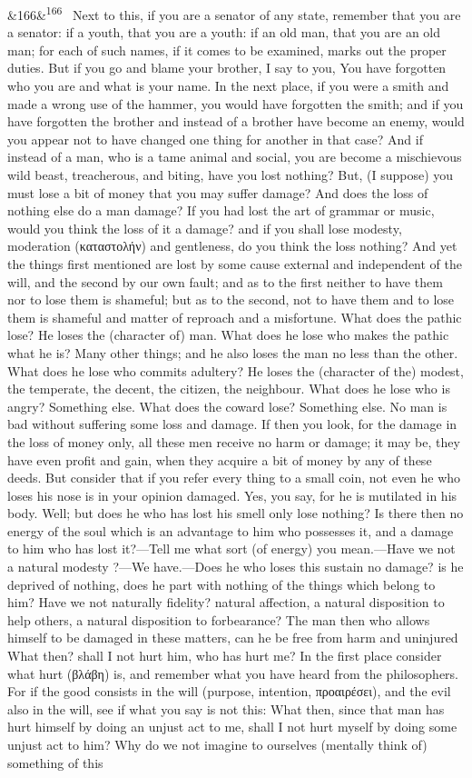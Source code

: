 \documentclass[12pt]{article}
\newcommand{\para}[1][]{\par\noindent\ifx&#1&\else\textsuperscript{\footnotesize #1}~\fi}
\begin{document}
\para[166] Next to this, if you are a senator of any state, remember that you are a senator: if a youth, that you are a youth: if an old man, that you are an old man; for each of such names, if it comes to be examined, marks out the proper duties. But if you go and blame your brother, I say to you, You have forgotten who you are and what is your name. In the next place, if you were a smith and made a wrong use of the hammer, you would have forgotten the smith; and if you have forgotten the brother and instead of a brother have become an enemy, would you appear not to have changed one thing for another in that case? And if instead of a man, who is a tame animal and social, you are become a mischievous wild beast, treacherous, and biting, have you lost nothing? But, (I suppose) you must lose a bit of money that you may suffer damage? And does the loss of nothing else do a man damage? If you had lost the art of grammar or music, would you think the loss of it a damage? and if you shall lose modesty, moderation (καταστολήν) and gentleness, do you think the loss nothing? And yet the things first mentioned are lost by some cause external and independent of the will, and the second by our own fault; and as to the first neither to have them nor to lose them is shameful; but as to the second, not to have them and to lose them is shameful and matter of reproach and a misfortune. What does the pathic lose? He loses the (character of) man. What does he lose who makes the pathic what he is? Many other things; and he also loses the man no less than the other. What does he lose who commits adultery? He loses the (character of the) modest, the temperate, the decent, the citizen, the neighbour. What does he lose who is angry? Something else. What does the coward lose? Something else. No man is bad without suffering some loss and damage. If then you look, for the damage in the loss of money only, all these men receive no harm or damage; it may be, they have even profit and gain, when they acquire a bit of money by any of these deeds. But consider that if you refer every thing to a small coin, not even he who loses his nose is in your opinion damaged. Yes, you say, for he is mutilated in his body. Well; but does he who has lost his smell only lose nothing? Is there then no energy of the soul which is an advantage to him who possesses it, and a damage to him who has lost it?—Tell me what sort (of energy) you mean.—Have we not a natural modesty ?—We have.—Does he who loses this sustain no damage? is he deprived of nothing, does he part with nothing of the things which belong to him? Have we not naturally fidelity? natural affection, a natural disposition to help others, a natural disposition to forbearance? The man then who allows himself to be damaged in these matters, can he be free from harm and uninjured What then? shall I not hurt him, who has hurt me? In the first place consider what hurt (βλάβη) is, and remember what you have heard from the philosophers. For if the good consists in the will (purpose, intention, προαιρέσει), and the evil also in the will, see if what you say is not this: What then, since that man has hurt himself by doing an unjust act to me, shall I not hurt myself by doing some unjust act to him? Why do we not imagine to ourselves (mentally think of) something of this 
\end{document}
